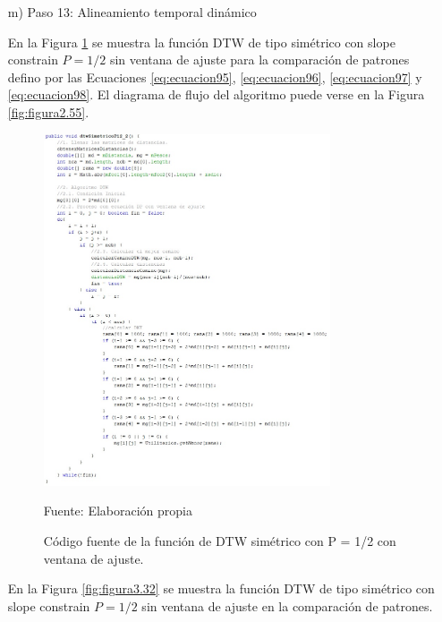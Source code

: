 \begin{enumerate}
\item[m)]Paso 13: Alineamiento temporal dinámico
\par
En la Figura \ref{fig:figura3.31} se muestra la función DTW de tipo simétrico con slope constrain $P = 1/2$ sin ventana de ajuste para la comparación de patrones defino por las Ecuaciones \eqref{eq:ecuacion95}, \eqref{eq:ecuacion96}, \eqref{eq:ecuacion97} y \eqref{eq:ecuacion98}. El diagrama de flujo del algoritmo puede verse en la Figura \ref{fig:figura2.55}.
\begin{figure}[H]
\captionsetup{justification=centering}
\begin{center}
\includegraphics[width=0.8\textwidth]{Imagenes/Cap3/image031}
\end{center}
\begin{center}
\vskip -0.5cm
\caption{\small{Código fuente de la función de DTW simétrico con P = 1/2 con ventana de ajuste.}}
\label{fig:figura3.31}
{\small{Fuente: Elaboración propia}}
\end{center}
\end{figure}
\vskip -0.5cm
En la Figura \ref{fig:figura3.32} se muestra la función DTW de tipo simétrico con slope constrain $P = 1/2$ sin ventana de ajuste en la comparación de patrones.
\begin{figure}[H]
\captionsetup{justification=centering}
\begin{center}

\end{center}
\end{figure}
\end{enumerate}
